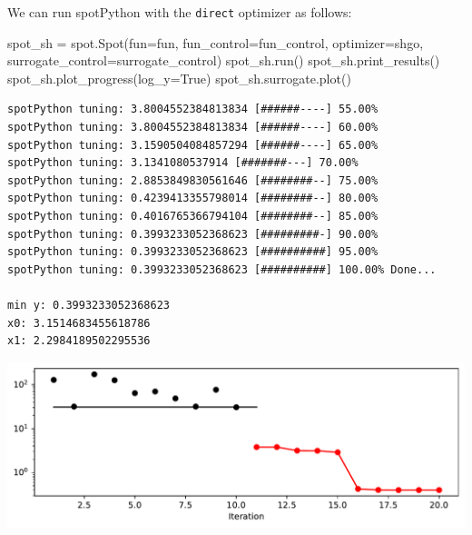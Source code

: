 \documentclass[
  letterpaper,
  DIV=11,
  numbers=noendperiod]{scrreprt}
\newenvironment{Shaded}{\begin{snugshade}}{\end{snugshade}}
\newcommand{\NormalTok}[1]{\textcolor[rgb]{0.00,0.23,0.31}{#1}}
\newcommand{\OperatorTok}[1]{\textcolor[rgb]{0.37,0.37,0.37}{#1}}
\newcommand{\VariableTok}[1]{\textcolor[rgb]{0.07,0.07,0.07}{#1}}
\begin{document}
\begin{tcolorbox}[enhanced jigsaw, left=2mm, opacitybacktitle=0.6, leftrule=.75mm, toptitle=1mm, opacityback=0, colback=white, rightrule=.15mm, colframe=quarto-callout-tip-color-frame, title=\textcolor{quarto-callout-tip-color}{\faLightbulb}\hspace{0.5em}{Tip: Selecting the Optimizer for the Surrogate}, toprule=.15mm, coltitle=black, bottomrule=.15mm, bottomtitle=1mm, colbacktitle=quarto-callout-tip-color!10!white, titlerule=0mm, breakable, arc=.35mm]

We can run spotPython with the \texttt{direct} optimizer as follows:

\begin{Shaded}
\begin{Highlighting}[]
\NormalTok{spot\_sh }\OperatorTok{=}\NormalTok{ spot.Spot(fun}\OperatorTok{=}\NormalTok{fun,}
\NormalTok{                    fun\_control}\OperatorTok{=}\NormalTok{fun\_control,}
\NormalTok{                    optimizer}\OperatorTok{=}\NormalTok{shgo,}
\NormalTok{                    surrogate\_control}\OperatorTok{=}\NormalTok{surrogate\_control)}
\NormalTok{spot\_sh.run()}
\NormalTok{spot\_sh.print\_results()}
\NormalTok{spot\_sh.plot\_progress(log\_y}\OperatorTok{=}\VariableTok{True}\NormalTok{)}
\NormalTok{spot\_sh.surrogate.plot()}
\end{Highlighting}
\end{Shaded}

\begin{verbatim}
spotPython tuning: 3.8004552384813834 [######----] 55.00% 
spotPython tuning: 3.8004552384813834 [######----] 60.00% 
spotPython tuning: 3.1590504084857294 [######----] 65.00% 
spotPython tuning: 3.1341080537914 [#######---] 70.00% 
spotPython tuning: 2.8853849830561646 [########--] 75.00% 
spotPython tuning: 0.4239413355798014 [########--] 80.00% 
spotPython tuning: 0.4016765366794104 [########--] 85.00% 
spotPython tuning: 0.3993233052368623 [#########-] 90.00% 
spotPython tuning: 0.3993233052368623 [##########] 95.00% 
spotPython tuning: 0.3993233052368623 [##########] 100.00% Done...

min y: 0.3993233052368623
x0: 3.1514683455618786
x1: 2.2984189502295536
\end{verbatim}

\includegraphics{004_spot_sklearn_optimization_files/figure-pdf/cell-11-output-2.pdf}


\end{tcolorbox}
\end{document}
